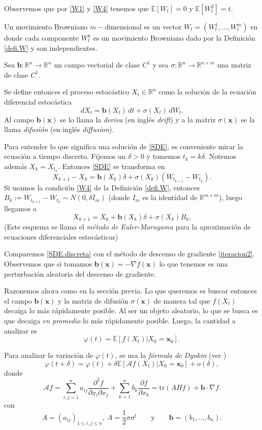 \documentclass[12pt, a4paper]{amsbook}
\newcommand{\R}{{\mathbb R}}
\newcommand{\E}{{\mathbb E}}
\newcommand{\A}{{\mathcal A}}
\newcommand{\xx}{{\mathbf x}}
\newcommand{\bb}{{\mathbf b}}
\theoremstyle{remark}
\theoremstyle{definition}
\numberwithin{section}{chapter}
\numberwithin{subsection}{section}
\numberwithin{equation}{section}
\numberwithin{figure}{chapter}
\begin{document}
Observemos que por \ref{W1} y \ref{W4} tenemos que $\E[W_t] = 0$ y $\E[W_t^2] = t$.

Un movimiento Browniano $m-$dimensional es un vector $W_t = (W_t^1,\dots, W_t^m)$ en donde cada componente $W_t^k$ es un movimiento Browniano dado por la Definición \ref{defi.W} y son independientes.

Sea $\bb\colon \R^n\to\R^n$ un campo vectorial de clase $C^1$ y sea $\sigma\colon \R^n\to\R^{n\times m}$ una matriz de clase $C^1$.

Se define entonces el proceso estocástico $X_t\in \R^n$ como la solución de la ecuación diferencial estocástica
\begin{equation}\label{SDE}
dX_t = \bb(X_t)\, dt + \sigma(X_t)\, dW_t.
\end{equation}
Al campo $\bb(\xx)$ se lo llama la {\em deriva} (en inglés {\em drift}) y a la matriz $\sigma(\xx)$ se la llama {\em difusión} (en inglés {\em diffusion}).

Para entender lo que significa una solución de \eqref{SDE}, es conveniente mirar la ecuación a tiempo discreto. Fijemos un $\delta>0$ y tomemos $t_k = k\delta$. Notemos además $X_k = X_{t_k}$. Entonces \eqref{SDE} se transforma en
$$
X_{k+1}-X_k = \bb(X_k) \delta + \sigma(X_k) (W_{t_{k+1}}-W_{t_k}).
$$
Si usamos la condición \ref{W4} de la Definición \ref{defi.W}, entonces $B_k:= W_{t_{k+1}}-W_{t_k} \sim N(0,\delta I_m)$ (donde $I_m$ es la identidad de $\R^{m\times m}$), luego llegamos a
\begin{equation}\label{SDE.discreta}
X_{k+1} = X_k + \bb(X_k) \delta + \sigma(X_k) B_k.
\end{equation}
(Este esquema se llama el {\em método de Euler-Maruyama} para la aproximación de ecuaciones diferenciales estocásticas) 

Comparemos \eqref{SDE.discreta} con el método de descenso de gradiente \eqref{iteracion2}. Observemos que si tomamos $\bb(\xx)=-\nabla f(\xx)$ lo que tenemos es una perturbación aleatoria del descenso de gradiente.

Razonemos ahora como en la sección previa. Lo que queremos es buscar entonces el campo $\bb(\xx)$ y la matriz de difusión $\sigma(\xx)$ de manera tal que $f(X_t)$ decaiga lo más rápidamente posible. Al ser un objeto aleatorio, lo que se busca es que decaiga {\em en promedio} lo más rápidamente posible. Luego, la cantidad a analizar es 
$$
\varphi(t) = \E[f(X_t)|X_0=\xx_0].
$$

Para analizar la variación de $\varphi(t)$, se usa la {\em fórmula de Dynkin} (ver \cite{Dynkin})
\begin{equation}\label{incremento}
\varphi(t+\delta) = \varphi(t) + \delta \E[\A f(X_t)|X_0=\xx_0] + o(\delta),
\end{equation}
donde
$$
\A f = \sum_{i, j=1}^n a_{ij} \frac{\partial^2 f}{\partial x_i \partial x_j} + \sum_{k=1}^n b_k \frac{\partial f}{\partial x_k} = \text{tr}(A Hf) + \bb\cdot\nabla f.
$$
con 
$$
A=(a_{ij})_{1\le i,j\le n},\ A = \frac12 \sigma \sigma^t \qquad\text{y}\qquad \bb=(b_1,\dots,b_n).
$$
\end{document}
